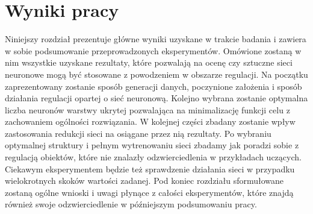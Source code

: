 \newpage %
\section{Wyniki pracy}
Niniejszy rozdział prezentuje główne wyniki uzyskane w trakcie badania i zawiera w sobie podsumowanie przeprowadzonych eksperymentów. Omówione zostaną w nim wszystkie uzyskane rezultaty, które pozwalają na ocenę czy sztuczne sieci neuronowe mogą być stosowane z powodzeniem w obszarze regulacji. Na początku zaprezentowany zostanie sposób generacji danych, poczynione założenia i sposób działania regulacji opartej o sieć neuronową. Kolejno wybrana zostanie optymalna liczba neuronów warstwy ukrytej pozwalająca na minimalizację funkcji celu z zachowaniem ogólności rozwiązania. W kolejnej części zbadany zostanie wpływ zastosowania redukcji sieci na osiągane przez nią rezultaty. Po wybraniu optymalnej struktury i pełnym wytrenowaniu sieci zbadamy jak poradzi sobie z regulacją obiektów, które nie znalazły odzwierciedlenia w przykładach uczących. Ciekawym eksperymentem będzie też sprawdzenie działania sieci w przypadku wielokrotnych skoków wartości zadanej. Pod koniec rozdziału sformułowane zostaną ogólne wnioski i uwagi płynące z całości eksperymentów, które znajdą również swoje odzwierciedlenie w późniejszym podsumowaniu pracy.


